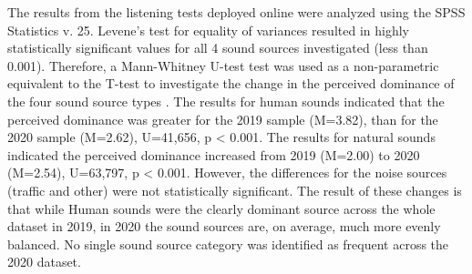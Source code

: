 \documentclass[
  authoryear,
  preprint,
  3p,
  onecolumn]{elsarticle}
\begin{document}
The results from the listening tests deployed online were analyzed using
the SPSS Statistics v. 25. Levene's test for equality of variances
resulted in highly statistically significant values for all 4 sound
sources investigated (less than 0.001). Therefore, a Mann-Whitney U-test
test was used as a non-parametric equivalent to the T-test to
investigate the change in the perceived dominance of the four sound
source types \citep{McKnight2010Mann}. The results for human sounds
indicated that the perceived dominance was greater for the 2019 sample
(M=3.82), than for the 2020 sample (M=2.62), U=41,656, p \textless{}
0.001. The results for natural sounds indicated the perceived dominance
increased from 2019 (M=2.00) to 2020 (M=2.54), U=63,797, p \textless{}
0.001. However, the differences for the noise sources (traffic and
other) were not statistically significant. The result of these changes
is that while Human sounds were the clearly dominant source across the
whole dataset in 2019, in 2020 the sound sources are, on average, much
more evenly balanced. No single sound source category was identified as
frequent across the 2020 dataset.
\end{document}
